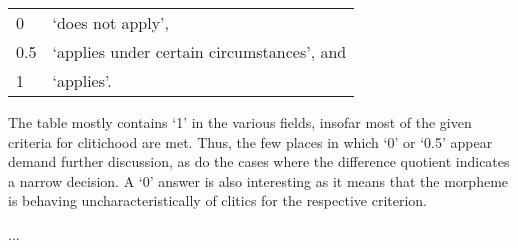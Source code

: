 \begin{longtabu} to .75\linewidth {X[1r] X[6l]}
0 & `does not apply',\\
0.5 & `applies under certain circumstances', and\\
1 & `applies'.\\
\end{longtabu}\addtocounter{table}{-1}

The table mostly contains `1' in the various fields, insofar most of the given 
criteria for clitichood are met. Thus, the few places in which `0' or `0.5' 
appear demand further discussion, as do the cases where the difference 
quotient indicates a narrow decision. A `0' answer is also interesting as it 
means that the morpheme is behaving uncharacteristically of clitics for the 
respective criterion.

...

